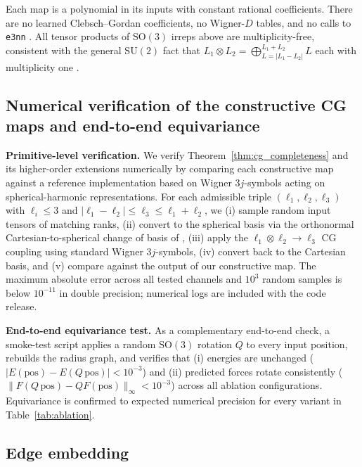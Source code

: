Each map is a polynomial in its inputs with constant rational coefficients. There are no learned Clebsch--Gordan coefficients, no Wigner-$D$ tables, and no calls to \texttt{e3nn} \citep{geiger2022e3nn}. All tensor products of $\mathrm{SO}(3)$ irreps above are multiplicity-free, consistent with the general $\mathrm{SU}(2)$ fact that $L_1 \otimes L_2 = \bigoplus_{L=|L_1-L_2|}^{L_1+L_2} L$ each with multiplicity one \citep{varshalovich1988quantum}.

\subsection{Numerical verification of the constructive CG maps and end-to-end equivariance}\label{supp:cg_test}

\textbf{Primitive-level verification.} We verify Theorem~\ref{thm:cg_completeness} and its higher-order extensions numerically by comparing each constructive map against a reference implementation based on Wigner $3j$-symbols acting on spherical-harmonic representations. For each admissible triple $(\ell_1, \ell_2, \ell_3)$ with $\ell_i \leq 3$ and $|\ell_1 - \ell_2| \leq \ell_3 \leq \ell_1 + \ell_2$, we (i) sample random input tensors of matching ranks, (ii) convert to the spherical basis via the orthonormal Cartesian-to-spherical change of basis of \citet{shao2025orthonormal}, (iii) apply the $\ell_1 \otimes \ell_2 \to \ell_3$ CG coupling using standard Wigner $3j$-symbols, (iv) convert back to the Cartesian basis, and (v) compare against the output of our constructive map. The maximum absolute error across all tested channels and $10^3$ random samples is below $10^{-11}$ in double precision; numerical logs are included with the code release.

\textbf{End-to-end equivariance test.} As a complementary end-to-end check, a smoke-test script applies a random $\mathrm{SO}(3)$ rotation $Q$ to every input position, rebuilds the radius graph, and verifies that (i) energies are unchanged ($|E(\mathrm{pos}) - E(Q\,\mathrm{pos})| < 10^{-3}$) and (ii) predicted forces rotate consistently ($\lVert F(Q\,\mathrm{pos}) - Q F(\mathrm{pos})\rVert_\infty < 10^{-3}$) across all ablation configurations. Equivariance is confirmed to expected numerical precision for every variant in Table~\ref{tab:ablation}.

\subsection{Edge embedding}\label{supp:edge_embed}


